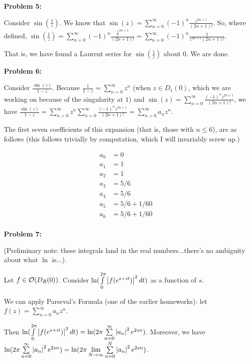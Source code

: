 \documentclass[a4paper,12pt]{article}
\begin{document}
\shunt

{\bf Problem 5:}

Consider $\sin(\frac{1}{z})$. We know that $\sin(z) = \sum\limits_{n=0}^\infty (-1)^n \frac{z^{2n+1}}{(2n+1)!}$. So, where defined, $\sin(\frac{1}{z}) = \sum\limits_{n=0}^\infty (-1)^n \frac{\frac{1}{z}^{2n+1}}{(2n+1)!} = \sum\limits_{n=0}^\infty (-1)^n \frac{1}{z^{2n+1}(2n+1)!}$.

That is, we have found a Laurent series for $\sin(\frac{1}{z})$ about $0$. We are done.

\shunt

{\bf Problem 6:}

Consider $\frac{\sin(z)}{1-z}$. Because $\frac{1}{1-z} = \sum\limits_{n=0}^\infty z^n$ (when $z \in D_1(0)$, which we are working on because of the singularity at $1$) and $\sin(z) = \sum\limits_{n=0}^\infty \frac{(-1)^n z^{2n+1}}{(2n+1)!}$, we have $\frac{\sin(z)}{1-z} = \sum\limits_{n=0}^\infty z^n \sum\limits_{n=0}^\infty \frac{(-1)^n z^{2n+1}}{(2n+1)!} = \sum\limits_{n=0}^\infty a_nz^n$.

The first seven coefficients of this expansion (that is, those with $n \leq 6$), are as follows (this follows trivially by computation, which I will invariably screw up.)

\begin{align*}
a_0 &= 0\\
a_1 &= 1\\
a_2 &= 1\\
a_3 &= 5/6\\
a_4 &= 5/6\\
a_5 &= 5/6 + 1/60\\
a_6 &= 5/6 + 1/60\\
\end{align*}

\shunt

{\bf Problem 7:}

(Preliminary note: these integrals land in the real numbers...there's no ambiguity about what $\ln$ is...).

Let $f \in \mathcal{O}(D_R(0))$. Consider $\ln(\int\limits_0^{2\pi} \left\lvert f(e^{s+it}) \right\rvert^2 dt)$ as a function of $s$.

We can apply Parseval's Formula (one of the earlier homeworks): let $f(z) = \sum\limits_{n=0}^\infty a_n z^n$.

Then $\ln( \int\limits_0^{2\pi} \left\lvert f(e^{s+it}) \right\rvert^2 dt) = \ln(2\pi \sum\limits_{n=0}^\infty \left\lvert a_n \right\rvert^2 e^{2sn})$. Moreover, we have $\ln(2\pi \sum\limits_{n=0}^\infty \left\lvert a_n \right\rvert^2 e^{2sn}) =  \ln(2\pi \lim\limits_{N \to \infty}\sum\limits_{n=0}^N \left\lvert a_n \right\rvert^2 e^{2sn})$. 
\end{document}
